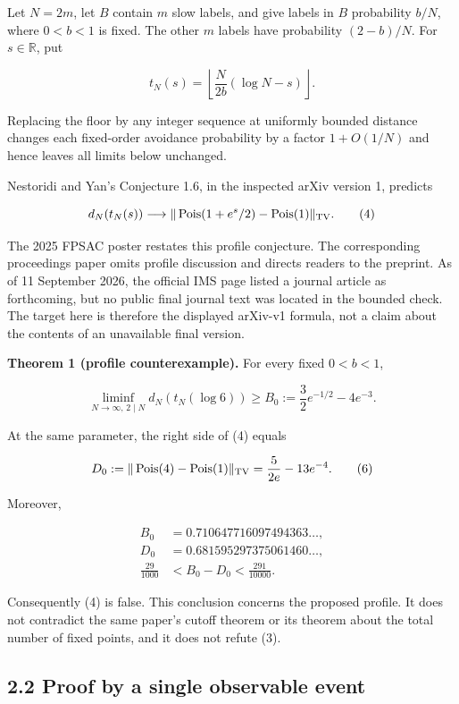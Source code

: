 \documentclass[
  british,
  11pt,
]{article}
\begin{document}
Let \(N=2m\), let \(B\) contain \(m\) slow labels, and give labels in
\(B\) probability \(b/N\), where \(0<b<1\) is fixed. The other \(m\)
labels have probability \((2-b)/N\). For \(s\in\mathbb R\), put

\[
t_N(s)=\left\lfloor\frac{N}{2b}(\log N-s)\right\rfloor.
\]

Replacing the floor by any integer sequence at uniformly bounded
distance changes each fixed-order avoidance probability by a factor
\(1+O(1/N)\) and hence leaves all limits below unchanged.

Nestoridi and Yan's Conjecture 1.6, in the inspected arXiv version 1,
predicts

\[
d_N(t_N(s))\longrightarrow
\|\operatorname{Pois}(1+e^s/2)-\operatorname{Pois}(1)\|_{\rm TV}. \tag{4}
\]

The 2025 FPSAC poster restates this profile conjecture. The
corresponding proceedings paper omits profile discussion and directs
readers to the preprint. As of 11 September 2026, the official IMS page
listed a journal article as forthcoming, but no public final journal
text was located in the bounded check. The target here is therefore the
displayed arXiv-v1 formula, not a claim about the contents of an
unavailable final version.

\textbf{Theorem 1 (profile counterexample).} For every fixed \(0<b<1\),

\[
\liminf_{N\to\infty,\,2\mid N}d_N(t_N(\log6))
\ge B_0:=\frac32e^{-1/2}-4e^{-3}.
\tag{5}
\]

At the same parameter, the right side of (4) equals

\[
D_0:=\|\operatorname{Pois}(4)-\operatorname{Pois}(1)\|_{\rm TV}
=\frac{5}{2e}-13e^{-4}.
\tag{6}
\]

Moreover,

\[
\begin{aligned}
B_0&=0.710647716097494363\ldots,\\
D_0&=0.681595297375061460\ldots,\\
\frac{29}{1000}&<B_0-D_0<\frac{291}{10000}.
\end{aligned} \tag{7}
\]

Consequently (4) is false. This conclusion concerns the proposed
profile. It does not contradict the same paper's cutoff theorem or its
theorem about the total number of fixed points, and it does not refute
(3).

\subsection{2.2 Proof by a single observable
event}\label{proof-by-a-single-observable-event}
\end{document}
